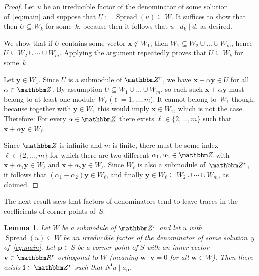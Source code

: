 \documentclass[a4paper]{sig-alternate}
\let\set\mathbbm
\def\vec#1{\mathbf{#1}}
\def\spread{\operatorname{Spread}}
\newtheorem{lemma}{Lemma}
\begin{document}
\begin{proof}
  Let $u$ be an irreducible factor of the denominator of some solution
  of~\eqref{eq:main} and suppose that $U:=\spread(u)\subseteq W$. It suffices
  to show that then $U\subseteq W_k$ for some~$k$, because then it follows that
  $u\mid d_k\mid d$, as desired.

  We show that if $U$ contains some vector $\vec x\not\in W_1$, then
  $W_1\subseteq W_2\cup\dots\cup W_m$, hence $U\subseteq W_2\cup\cdots\cup W_m$.
  Applying the argument repeatedly proves that $U\subseteq W_k$ for some~$k$.

  Let $\vec y\in W_1$. Since $U$ is a submodule of $\set Z^r$, we have $\vec
  x+\alpha\vec y\in U$ for all $\alpha\in\set Z$.  By assumption $U\subseteq
  W_1\cup\dots\cup W_m$, so each such $\vec x+\alpha\vec y$ must belong to at
  least one module~$W_\ell$ ($\ell=1,\dots,m$). It cannot belong to~$W_1$ though,
  because together with $\vec y\in W_1$ this would imply $\vec x\in W_1$, which
  is not the case. Therefore: For every $\alpha\in\set Z$ there exists
  $\ell\in\{2,\dots,m\}$ such that $\vec x+\alpha\vec y\in W_\ell$.

  Since $\set Z$ is infinite and $m$ is finite, there must be some index
  $\ell\in\{2,\dots,m\}$ for which there are two different
  $\alpha_1,\alpha_2\in\set Z$ with $\vec x+\alpha_1\vec y\in W_\ell$ and
  $\vec x+\alpha_2\vec y\in W_\ell$. Since $W_\ell$ is also a submodule of~$\set
  Z^r$, it follows that $(\alpha_1-\alpha_2)\vec y\in W_\ell$, and finally $\vec
  y\in W_\ell\subseteq W_2\cup\cdots\cup W_m$, as claimed.
\end{proof}

The next result says that factors of denominators tend to leave traces in the
coefficients of corner points of~$S$.

\begin{lemma}\label{lem:2}
  Let $W$ be a submodule of $\set Z^r$ and let $u$ with $\spread(u)\subseteq W$
  be an irreducible factor of the denominator of some solution~$y$ of~\eqref{eq:main}.
  Let $\vec p\in S$ be a corner point of $S$ with an inner vector $\vec v\in\set R^r$
  orthogonal to $W$ (meaning $\vec w\cdot\vec v=0$ for all $\vec w\in W$).
  Then there exists $\vec i\in\set Z^r$ such that $N^{\vec i}u\mid a_{\vec p}$.
\end{lemma}
\end{document}
